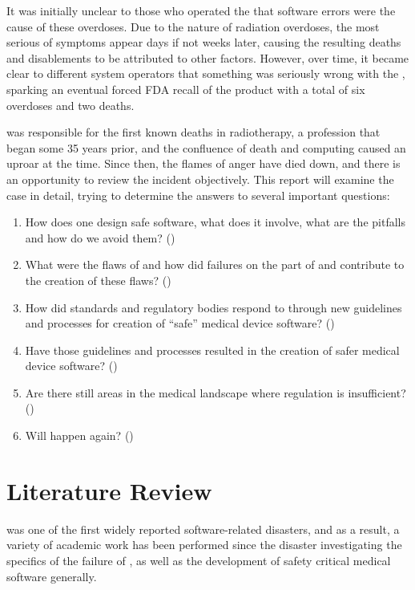 \documentclass{cshonours}
\begin{document}
It was initially unclear to those who operated the \ther that software errors were the cause of these overdoses. Due to the nature of radiation overdoses, the most serious of symptoms appear days if not weeks later, causing the resulting deaths and disablements to be attributed to other factors. However, over time, it became clear to different system operators that something was seriously wrong with the \ther, sparking an eventual forced FDA recall of the product with a total of six overdoses and two deaths.

\ther was responsible for the first known deaths in radiotherapy, a profession that began some 35 years prior, and the confluence of death and computing caused an uproar at the time. Since then, the flames of anger have died down, and there is an opportunity to review the incident objectively. This report will examine the \ther case in detail, trying to determine the answers to several important questions:
\begin{enumerate}
 \item How does one design safe software, what does it involve, what are the pitfalls and how do we avoid them? ()
 \item What were the flaws of \ther and how did failures on the part of \aecl and \cgr contribute to the creation of these flaws? ()
 \item How did standards and regulatory bodies respond to \ther through new guidelines and processes for creation of ``safe'' medical device software? ()
 \item Have those guidelines and processes resulted in the creation of safer medical device software? ()
 \item Are there still areas in the medical landscape where regulation is insufficient? ()
 \item Will \ther happen again? ()
\end{enumerate}


\chapter{Literature Review}
\label{chap:litreview}
\ther was one of the first widely reported software-related disasters, and as a result, a variety of academic work has been performed since the disaster investigating the specifics of the failure of \ther, as well as the development of safety critical  medical software generally.
\end{document}

